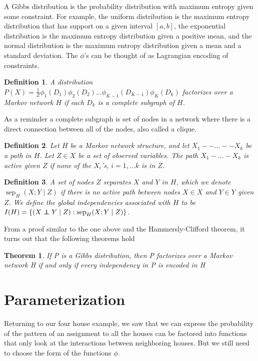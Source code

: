 \documentclass{article}
\newcommand\independent{\protect\mathpalette{\protect\independenT}{\perp}}
\def\independenT#1#2{\mathrel{\rlap{$#1#2$}\mkern2mu{#1#2}}}
\newtheorem{theorem}{Theorem}
\newtheorem{mydef}{Definition}
\begin{document}
A Gibbs distribution is the probability distribution with maximum
entropy given some constraint. For example, the uniform distribution
is the maximum entropy distribution that has support on a given
interval $[a,b]$, the exponential distribution is the maximum entropy
distribution given a positive mean, and the normal distribution is the
maximum entropy distribution given a mean and a standard
deviation. The $\phi$'s can be thought of as Lagrangian encoding of
constraints.

\begin{mydef}
A distribution
$P(X)=\frac{1}{Z}\phi_1(D_1)\phi_2(D_2)...\phi_{K-1}(D_{K-1})\phi_K(D_k)$
factorizes over a Markov network $H$ if each $D_k$ is a complete
subgraph of $H$.
\end{mydef}

 As a reminder a complete subgraph is set of nodes in
a network where there is a direct connection between all of the nodes,
also called a clique.

\begin{mydef}
Let $H$ be a Markov network structure, and let $X_1--...--X_k$ be a
path in $H$. Let $Z \in X$ be a set of observed variables. The path
$X_1-...-X_k$ is active given $Z$ if none of the $X_i$'s, $i =
1,...k$ is in $Z$.
\end{mydef}

\begin{mydef}
A set of nodes $Z$ separates $X$ and $Y$ in $H$, which we denote
$\operatorname{sep}_H(X;Y \mid Z)$ if there is no active path between
nodes $X \in X$ and $Y \in Y$ given $Z$. We define the global
independencies associated with $H$ to be $I(H) = \left\{(X \independent Y \mid Z) : \operatorname{sep}_H(X;Y \mid Z)\right\}$.
\end{mydef}

From a proof similar to the one above and the Hammersly-Clifford
theorem, it turns out that the following theorems hold

\begin{theorem}
  If P is a Gibbs distribution, then P factorizes over a Markov network
H if and only if every independency in P is encoded in H
\end{theorem}

\section{Parameterization}
Returning to our four house example, we saw that we can express the
probability of the pattern of an assignment to all the houses can be
factored into functions that only look at the interactions between
neighboring houses. But we still need to choose the form of the
functions $\phi$.
\end{document}
